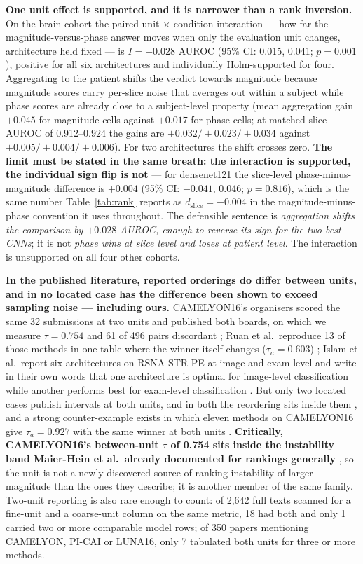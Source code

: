 \documentclass[11pt,a4paper]{article}
\begin{document}
\textbf{One unit effect is supported, and it is narrower than a rank
inversion.} On the brain cohort the paired unit $\times$ condition interaction
--- how far the magnitude-versus-phase answer moves when only the evaluation unit
changes, architecture held fixed --- is $I=+0.028$ AUROC (95\% CI: 0.015, 0.041;
$p=0.001$), positive for all six architectures and individually Holm-supported
for four. Aggregating to the patient shifts the verdict towards magnitude because
magnitude scores carry per-slice noise that averages out within a subject while
phase scores are already close to a subject-level property (mean aggregation gain
$+0.045$ for magnitude cells against $+0.017$ for phase cells; at matched slice
AUROC of 0.912--0.924 the gains are $+0.032/+0.023/+0.034$ against
$+0.005/+0.004/+0.006$). For two architectures the shift crosses zero. \textbf{The
limit must be stated in the same breath: the interaction is supported, the
individual sign flip is not} --- for densenet121 the slice-level phase-minus-magnitude
difference is $+0.004$ (95\% CI: $-0.041$, 0.046; $p=0.816$), which is the same number
Table~\ref{tab:rank} reports as $d_{\text{slice}}=-0.004$ in the magnitude-minus-phase
convention it uses throughout. The defensible sentence is
\emph{aggregation shifts the comparison by $+0.028$ AUROC, enough to reverse its
sign for the two best CNNs}; it is not \emph{phase wins at slice level and loses
at patient level}. The interaction is unsupported on all four other cohorts.

\textbf{In the published literature, reported orderings do differ between units,
and in no located case has the difference been shown to exceed sampling noise ---
including ours.} CAMELYON16's organisers scored the same
32 submissions at two units and published both boards, on which we measure
$\tau=0.754$ and 61 of 496 pairs discordant
\citep{camelyon16leaderboard,bejnordi2017camelyon16}; Ruan et al.\ reproduce 13 of
those methods in one table where the winner itself changes ($\tau_a=0.603$)
\citep{ruan2021wsi}; Islam et al.\ report six architectures on RSNA-STR PE at image
and exam level and write in their own words that one architecture is optimal for
image-level classification while another performs best for exam-level
classification \citep{islam2021pe}. But only two located cases publish intervals at
both units, and in both the reordering sits inside them
\citep{jarkman2022generalization,guo2019wsi}, and a strong counter-example exists in which eleven
methods on CAMELYON16 give $\tau_a=0.927$ with the same winner at both units
\citep{chen2025camcsa}. \textbf{Critically, CAMELYON16's between-unit $\tau$ of 0.754
sits inside the instability band Maier-Hein et al.\ already documented for
rankings generally} \citep{maierhein2018rankings}, so the unit is not a newly discovered
source of ranking instability of larger magnitude than the ones they describe; it
is another member of the same family. Two-unit reporting is also rare enough to
count: of 2,642 full texts scanned for a fine-unit and a coarse-unit column on
the same metric, 18 had both and only 1 carried two or more comparable model
rows; of 350 papers mentioning CAMELYON, PI-CAI or LUNA16, only 7 tabulated both
units for three or more methods.
\end{document}
